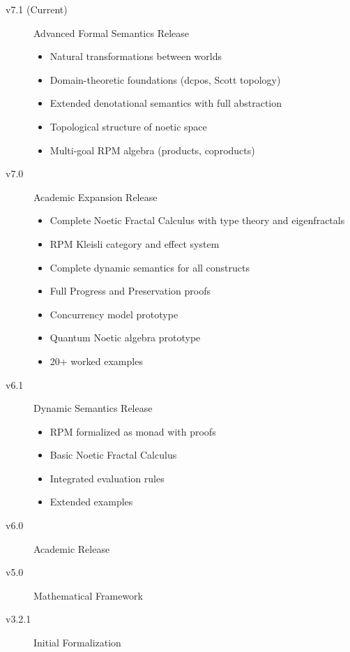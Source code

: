 \documentclass[11pt,twoside,openright]{book}
\theoremstyle{definition}
\theoremstyle{plain}
\theoremstyle{remark}
\begin{document}
\begin{description}
\item[v7.1 (Current)] Advanced Formal Semantics Release
  \begin{itemize}
  \item Natural transformations between worlds
  \item Domain-theoretic foundations (dcpos, Scott topology)
  \item Extended denotational semantics with full abstraction
  \item Topological structure of noetic space
  \item Multi-goal RPM algebra (products, coproducts)
  \end{itemize}

\item[v7.0] Academic Expansion Release
  \begin{itemize}
  \item Complete Noetic Fractal Calculus with type theory and eigenfractals
  \item RPM Kleisli category and effect system
  \item Complete dynamic semantics for all constructs
  \item Full Progress and Preservation proofs
  \item Concurrency model prototype
  \item Quantum Noetic algebra prototype
  \item 20+ worked examples
  \end{itemize}

\item[v6.1] Dynamic Semantics Release
  \begin{itemize}
  \item RPM formalized as monad with proofs
  \item Basic Noetic Fractal Calculus
  \item Integrated evaluation rules
  \item Extended examples
  \end{itemize}

\item[v6.0] Academic Release

\item[v5.0] Mathematical Framework

\item[v3.2.1] Initial Formalization
\end{description}

\backmatter
\end{document}
